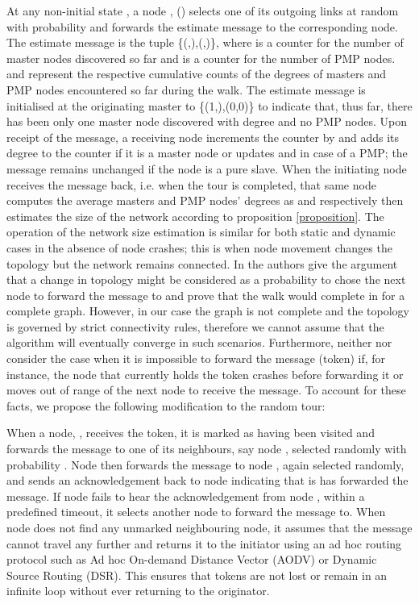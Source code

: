 \documentclass[twocolumn,10pt,conference]{IEEEtran}
\begin{document}
At any non-initial state , a node , 
() selects one of its outgoing links at random with probability  and forwards the estimate 
message to the corresponding node. The estimate message is the tuple \{(,),(,)\}, where  
is a counter for the number of master nodes discovered so far and  is a counter for the number of PMP nodes.  and 
 represent the respective cumulative counts of the degrees of masters and PMP nodes encountered so far during 
the walk. The estimate message is initialised at the originating master  to \{(1,),(0,0)\} to indicate that, thus 
far, there has been only one master node discovered with degree  and no PMP nodes. Upon receipt of the message, a receiving node increments the counter  by  and adds its degree to the counter  if it is a master 
node or updates  and  in case of a PMP; the message remains unchanged if the node is a pure slave.
When   the   initiating   node   receives   the message back, i.e. when the tour is completed, that same node computes the average masters and PMP nodes' degrees as  and  respectively then 
estimates the size of the network according to proposition \ref{proposition}. The operation of the network size estimation is similar for 
both static and dynamic cases in the absence of node crashes; this is when node movement changes the topology but the 
network remains connected. In \cite{ref26} the authors give the argument that a change in topology might be considered as a 
probability to chose the next node to forward the message to and prove that the walk would complete in  for a 
complete graph. However, in our case the graph is not complete and the topology is governed by strict connectivity rules, 
therefore we cannot assume that the algorithm will eventually converge in such scenarios. Furthermore, neither \cite{ref20} 
nor \cite{ref26} consider the case when it is impossible to forward the message (token) if, for instance, the 
node that currently holds the token crashes before forwarding it or moves out of range of the next node to receive the 
message. To account for these facts, we propose the following modification to the random tour:

When a node, , receives the token, it is marked as having been visited and forwards the message to one of its 
neighbours, say node , selected randomly with probability . Node  then forwards the message to node 
, again selected randomly, and sends an acknowledgement back to node  indicating that is has forwarded the message. If node  
fails to hear the acknowledgement from node , within a predefined timeout, it selects another node to forward the 
message to. When node  does not find any unmarked neighbouring node, it assumes that the message cannot travel 
any further and returns it to the initiator using an ad hoc routing protocol such as Ad hoc On-demand Distance Vector (AODV) or Dynamic Source Routing (DSR). This ensures that tokens are not lost or remain in an infinite loop without ever returning to the originator.  
\end{document}
